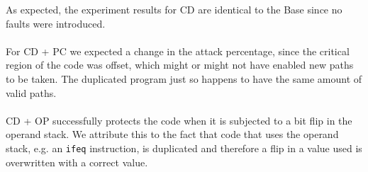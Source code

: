 As expected, the experiment results for CD are identical to the Base since no faults were introduced.\\\\
For CD + PC we expected a change in the attack percentage, since the critical region of the code was offset, which might or might not have enabled new paths to be taken. The duplicated program just so happens to have the same amount of valid paths.\\\\
CD + OP successfully protects the code when it is subjected to a bit flip in the operand stack. We attribute this to the fact that code that uses the operand stack, e.g. an \texttt{ifeq} instruction, is duplicated and therefore a flip in a value used is overwritten with a correct value.